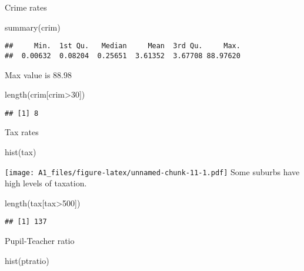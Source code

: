 \documentclass[
]{article}
\newenvironment{Shaded}{\begin{snugshade}}{\end{snugshade}}
\newcommand{\DecValTok}[1]{\textcolor[rgb]{0.00,0.00,0.81}{#1}}
\newcommand{\FunctionTok}[1]{\textcolor[rgb]{0.00,0.00,0.00}{#1}}
\newcommand{\NormalTok}[1]{#1}
\newcommand{\SpecialCharTok}[1]{\textcolor[rgb]{0.00,0.00,0.00}{#1}}
\begin{document}
Crime rates

\begin{Shaded}
\begin{Highlighting}[]
\FunctionTok{summary}\NormalTok{(crim)}
\end{Highlighting}
\end{Shaded}

\begin{verbatim}
##     Min.  1st Qu.   Median     Mean  3rd Qu.     Max. 
##  0.00632  0.08204  0.25651  3.61352  3.67708 88.97620
\end{verbatim}

Max value is 88.98

\begin{Shaded}
\begin{Highlighting}[]
\FunctionTok{length}\NormalTok{(crim[crim}\SpecialCharTok{\textgreater{}}\DecValTok{30}\NormalTok{])}
\end{Highlighting}
\end{Shaded}

\begin{verbatim}
## [1] 8
\end{verbatim}

Tax rates

\begin{Shaded}
\begin{Highlighting}[]
\FunctionTok{hist}\NormalTok{(tax)}
\end{Highlighting}
\end{Shaded}

\texttt{[image: A1\_files/figure-latex/unnamed-chunk-11-1.pdf]} Some
suburbs have high levels of taxation.

\begin{Shaded}
\begin{Highlighting}[]
\FunctionTok{length}\NormalTok{(tax[tax}\SpecialCharTok{\textgreater{}}\DecValTok{500}\NormalTok{])}
\end{Highlighting}
\end{Shaded}

\begin{verbatim}
## [1] 137
\end{verbatim}

Pupil-Teacher ratio

\begin{Shaded}
\begin{Highlighting}[]
\FunctionTok{hist}\NormalTok{(ptratio)}
\end{Highlighting}
\end{Shaded}
\end{document}
